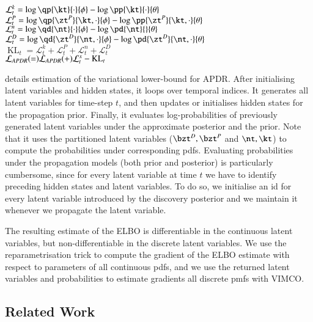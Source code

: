\begin{algorithm}
{        
        $\mathcal{L}_t^k = \log{ \qp{\kt}{\cdot}{\phi} } - \log{ \pp{\kt}{\cdot}{\theta} }$\\
             $\mathcal{L}_t^P =
        \log{ \qp{\zt^P}{\kt, \cdot}{\phi} }
        - \log{ \pp{\zt^P}{\kt, \cdot}{\theta} }$\\
        $\mathcal{L}_t^n = \log{ \qd{\nt}{\cdot}{\phi} } - \log{ \pd{\nt}{}{\theta} }$\\
        $\mathcal{L}_t^D =
        \log{ \qd{\zt^D}{\nt, \cdot}{\phi} }
        - \log{ \pd{\zt^D}{\nt, \cdot}{\theta} }$\\
       $\operatorname{KL}_t = \mathcal{L}_t^k + \mathcal{L}_t^P + \mathcal{L}_t^n + \mathcal{L}_t^D$\\
       $\loss[APDR] = \loss[APDR] + \mathcal{L}_t^x - \operatorname{KL}_t$
    }
    \Output{$\loss[APDR], \bzTs, \nTs, \kTs, \q{\bzTs, \nTs, \kTs}{\bxTs}{\phi}$}
\end{algorithm}

 details estimation of the variational lower-bound for APDR. After initialising latent variables and hidden states, it loops over temporal indices. It generates all latent variables for time-step $t$, and then updates or initialises hidden states for the propagation prior. Finally, it evaluates log-probabilities of previously generated latent variables under the approximate posterior and the prior. Note that it uses the partitioned latent variables ($\bzt^D, \bzt^P$ and $\nt, \kt$) to compute the probabilities under corresponding pdfs. Evaluating probabilities under the propagation models (both prior and posterior) is particularly cumbersome, since for every latent variable at time $t$ we have to identify preceding hidden states and latent variables. To do so, we initialise an id for every latent variable introduced by the discovery posterior and we maintain it whenever we propagate the latent variable.

The resulting estimate of the ELBO is differentiable in the continuous latent variables, but non-differentiable in the discrete latent variables. We use the reparametrisation trick to compute the gradient of the ELBO estimate with respect to parameters of all continuous pdfs, and we use the returned latent variables and probabilities to estimate gradients \wrt all discrete pmfs with VIMCO. 

\subsection{Related Work}
\label{sec:related_work}


